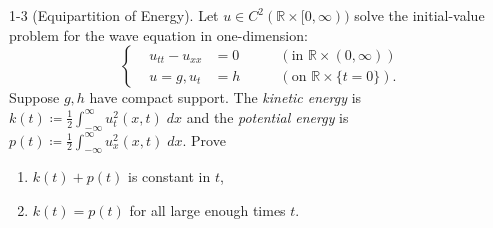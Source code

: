 \documentclass{article}
\numberwithin{equation}{section}
\begin{document}
	\begin{prb}{1-3}
		(Equipartition of Energy). Let $u \in C^{2}(\mathbb{R} \times [0,\infty))$ solve the initial-value problem for the wave equation in one-dimension: 
		\begin{equation*}
			\left\{
			\begin{alignedat}{3}
				&u_{tt} - u_{xx} &=0 \qquad &(\text{in } \mathbb{R} \times (0,\infty)) \\
				&u=g, u_t &= h \qquad &(\text{on } \mathbb{R} \times \{t = 0\}).
			\end{alignedat}
			\right. 
		\end{equation*} 
		Suppose $g,h$ have compact support. The \textit{kinetic energy} is $k(t) \coloneqq \frac{1}{2}\int_{-\infty}^{\infty}u_t^2(x,t)\;dx$ and the \textit{potential energy} is $p(t) \coloneqq \frac{1}{2}\int_{-\infty}^{\infty}u_x^2(x,t)\;dx$. Prove \vspace{-0.25cm}
		\begin{enumerate}[itemsep =-2pt,label =(\roman{*})]
			\item $k(t) + p(t)$ is constant in $t$, 
			\item $k(t) = p(t)$ for all large enough times $t$. 
		\end{enumerate}
		\label{prb:equipartition_of_energy}
	\end{prb}
\end{document}
